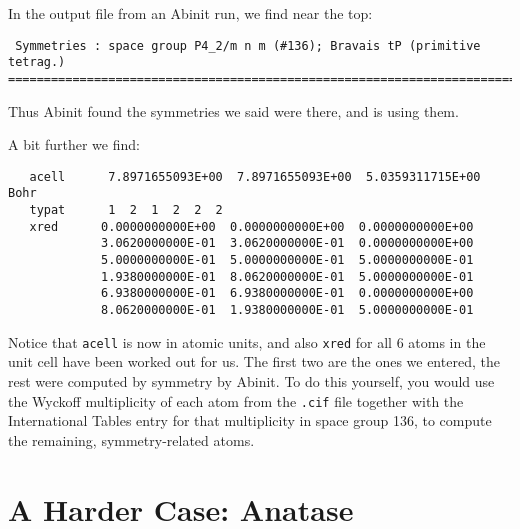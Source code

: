 \documentclass{article}
\begin{document}
In the output file from an {\sc Abinit} run, we find near the top:
\begin{verbatim}
 Symmetries : space group P4_2/m n m (#136); Bravais tP (primitive tetrag.)
================================================================================
\end{verbatim}
Thus {\sc Abinit} found the symmetries we said were there, and is using them.

A bit further we find:
\begin{verbatim}
   acell      7.8971655093E+00  7.8971655093E+00  5.0359311715E+00 Bohr
   typat      1  2  1  2  2  2
   xred      0.0000000000E+00  0.0000000000E+00  0.0000000000E+00
             3.0620000000E-01  3.0620000000E-01  0.0000000000E+00
             5.0000000000E-01  5.0000000000E-01  5.0000000000E-01
             1.9380000000E-01  8.0620000000E-01  5.0000000000E-01
             6.9380000000E-01  6.9380000000E-01  0.0000000000E+00
             8.0620000000E-01  1.9380000000E-01  5.0000000000E-01
\end{verbatim}
Notice that {\tt acell} is now in atomic units, and also {\tt xred} for all 6 atoms in the
unit cell have been worked out for us. The first two are the ones we entered, the rest were
computed by symmetry by {\sc Abinit}. To do this yourself, you would use the Wyckoff multiplicity
of each atom from the {\tt .cif} file together with the International Tables entry for that
multiplicity in space group 136, to compute the remaining, symmetry-related atoms. 

\section{A Harder Case: Anatase}
\end{document}
